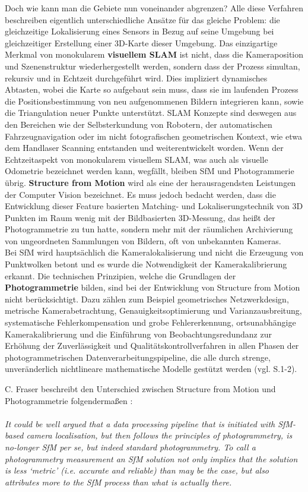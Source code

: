 Doch wie kann man die Gebiete nun voneinander abgrenzen? Alle diese Verfahren beschreiben eigentlich unterschiedliche Ansätze für das gleiche Problem: die gleichzeitige Lokalisierung eines Sensors in Bezug auf seine Umgebung bei gleichzeitiger Erstellung einer 3D-Karte dieser Umgebung. Das einzigartige Merkmal von monokularem \textbf{visuellem SLAM} ist nicht, dass die Kameraposition und Szenenstruktur wiederhergestellt werden, sondern dass der Prozess simultan, rekursiv und in Echtzeit durchgeführt wird. Dies impliziert dynamisches Abtasten, wobei die Karte so aufgebaut sein muss, dass sie im laufenden Prozess die Positionsbestimmung von neu aufgenommenen Bildern integrieren kann, sowie die Triangulation neuer Punkte unterstützt. SLAM Konzepte sind deswegen aus den Bereichen wie der Selbsterkundung von Robotern, der automatischen Fahrzeugnavigation oder im nicht fotografischen geometrischen Kontext, wie etwa dem Handlaser Scanning entstanden und weiterentwickelt worden. Wenn der Echtzeitaspekt von monokularem visuellem SLAM, was auch als visuelle Odometrie bezeichnet werden kann, wegfällt, bleiben SfM und Photogrammerie übrig. \textbf{Structure from Motion} wird als eine der herausragendsten Leistungen der Computer Vision bezeichnet. Es muss jedoch bedacht werden, dass die Entwicklung dieser Feature basierten Matching- und Lokaliserungstechnik von 3D Punkten im Raum wenig mit der Bildbasierten 3D-Messung, das heißt der Photogrammetrie zu tun hatte, sondern mehr mit der räumlichen Archivierung von ungeordneten Sammlungen von Bildern, oft von unbekannten Kameras. \\ Bei SfM wird hauptsächlich die Kameralokalisierung und nicht die Erzeugung von Punktwolken betont und es wurde die Notwendigkeit der Kamerakalibrierung erkannt. Die technischen Prinzipien, welche die Grundlagen der \textbf{Photogrammetrie} bilden, sind bei der Entwicklung von Structure from Motion nicht berücksichtigt. Dazu zählen zum Beispiel geometrisches Netzwerkdesign, metrische Kamerabetrachtung, Genauigkeitsoptimierung und Varianzausbreitung, systematische Fehlerkompensation und grobe Fehlererkennung, ortsunabhängige Kamerakalibrierung und die Einführung von Beobachtungsredundanz zur Erhöhung der Zuverlässigkeit und Qualitätskontrollverfahren in allen Phasen der photogrammetrischen Datenverarbeitungspipeline, die alle durch strenge, unveränderlich nichtlineare mathematische Modelle gestützt werden (vgl. \cite{vergleich_fraser} S.1-2).

C. Fraser beschreibt den Unterschied zwischen Structure from Motion und Photogrammetrie folgendermaßen \cite{vergleich_fraser}: \\ \\ \textit{ \glqq It could be well argued that a data processing pipeline that is initiated with SfM-based camera localisation, but then follows the principles of photogrammetry, is no-longer SfM per se, but indeed standard photogrammetry. To call a photogrammetry measurement an SfM solution not only implies that the solution is less ‘metric’ (i.e. accurate and reliable) than may be the case, but also attributes more to the SfM process than what is actually there.\grqq }

